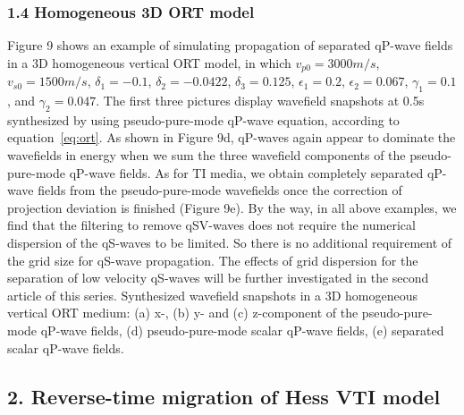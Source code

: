 \subsubsection{1.4 Homogeneous 3D ORT model}


Figure 9 shows an example of simulating propagation of separated qP-wave fields in a 3D homogeneous
 vertical ORT model, in which $v_{p0}=3000 m/s$,
$v_{s0}=1500 m/s$, $\delta_{1}=-0.1$, $\delta_{2}=-0.0422$, $\delta_{3}=0.125$, $\epsilon_{1}=0.2$,
$\epsilon_{2}=0.067$, $\gamma_{1}=0.1$, and $\gamma_{2}=0.047$.
The first three pictures display wavefield snapshots at 0.5s synthesized by using
 pseudo-pure-mode qP-wave equation, according to equation~\ref{eq:ort}.
As shown in Figure 9d, qP-waves again appear to dominate the wavefields in energy when we sum the 
three wavefield components of the pseudo-pure-mode qP-wave fields.
As for TI media, we obtain completely separated qP-wave fields from the
 pseudo-pure-mode wavefields once the correction of projection deviation is finished (Figure 9e).
By the way, in all above examples, we find that the filtering to remove qSV-waves does not
require the numerical dispersion of the qS-waves to be limited. So there is no additional requirement
of the grid size for qS-wave propagation. The effects of grid dispersion for the separation of low velocity
qS-waves will be further investigated in the second article of this series.
{
Synthesized wavefield snapshots in a 3D homogeneous vertical ORT medium: (a) x-, (b) y- and (c) z-component
 of the pseudo-pure-mode qP-wave fields, (d) pseudo-pure-mode scalar qP-wave fields, (e) separated scalar qP-wave fields.
}


\subsection{2. Reverse-time migration of Hess VTI model}

